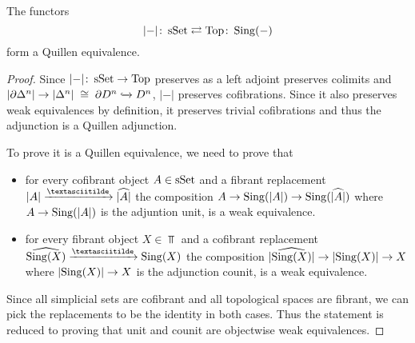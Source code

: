 \begin{prop}
    The functors
    \begin{equation*}
        \lvert-\rvert\colon\operatorname{sSet}\rightleftarrows\operatorname{Top}\colon\operatorname{Sing}(-)
    \end{equation*}
    form a Quillen equivalence. 
    \begin{proof}
        Since $\lvert-\rvert\colon\operatorname{sSet}\to\operatorname{Top}$ preserves as a left adjoint preserves colimits and $\lvert\partial\Delta^n\rvert\to\lvert\Delta^n\rvert\;\cong\;\partial D^n\xhookrightarrow{} D^n$, $\lvert-\rvert$ preserves cofibrations.
        Since it also preserves weak equivalences by definition, it preserves trivial cofibrations and thus the adjunction is a Quillen adjunction.

        To prove it is a Quillen equivalence, we need to prove that 
        \begin{itemize}
            \item for every cofibrant object $A\in\operatorname{sSet}$ and a fibrant replacement $\lvert A\rvert\xrightarrow{\textasciitilde}\widehat{\lvert A\rvert}$ the composition $A\to\operatorname{Sing}(\lvert A\rvert)\to\operatorname{Sing}(\widehat{\lvert A\rvert})$ where $A\to\operatorname{Sing}(\lvert A\rvert)$ is the adjuntion unit, is a weak equivalence.
            \item for every fibrant object $X\in\Top$ and a cofibrant replacement $\widehat{\Sing(X)}\xrightarrow{\textasciitilde}\Sing(X)$ the composition $\lvert\widehat{\operatorname{Sing}(X)}\rvert\to\lvert\operatorname{Sing}(X)\rvert\to X$ where $\lvert\operatorname{Sing}(X)\rvert\to X$ is the adjunction counit, is a weak equivalence.
        \end{itemize}
        Since all simplicial sets are cofibrant and all topological spaces are fibrant, we can pick the replacements to be the identity in both cases.
        Thus the statement is reduced to proving that unit and counit are objectwise weak equivalences. %
    \end{proof}
\end{prop}
